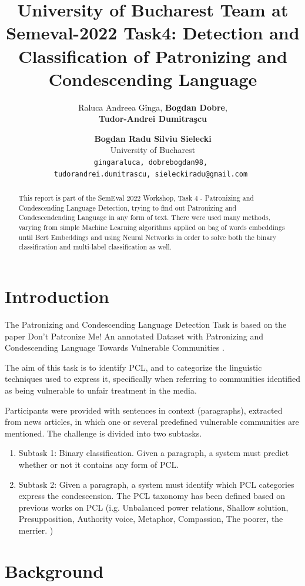 \documentclass[11pt]{article}
\title{University of Bucharest Team at Semeval-2022 Task4: Detection and
	Classification of Patronizing and Condescending Language}
\author{Raluca Andreea G\^inga, {\bf Bogdan Dobre},  \\  {\bf Tudor-Andrei Dumitra\c{s}cu} \and {\bf Bogdan Radu Silviu Sielecki}\\
    University of Bucharest \\
\texttt{gingaraluca, dobrebogdan98, }\\
\texttt{tudorandrei.dumitrascu, sieleckiradu@gmail.com }
}
\begin{document}
\maketitle

\begin{abstract}
	This report is part of the SemEval 2022 Workshop, Task 4 - Patronizing and
	Condescending Language Detection, trying to find out Patronizing and
	Condescendending Language in any form of text. There were used many methods,
	varying from simple Machine Learning algorithms applied on bag of words
	embeddings until Bert Embeddings and using Neural Networks in order to solve
	both the binary classification and multi-label classification as well.
\end{abstract}

\section{Introduction}

The Patronizing and Condescending Language Detection Task \cite{perezalmendros2022semeval} is based on the
paper Don't Patronize Me! An annotated Dataset with Patronizing and
Condescending Language Towards Vulnerable Communities \cite{perezalmendros2020dont}.

The aim of this task is to identify PCL, and to categorize the linguistic
techniques used to express it, specifically when referring to communities
identified as being vulnerable to unfair treatment in the media.

Participants were provided with sentences in context (paragraphs), extracted
from news articles, in which one or several predefined vulnerable
communities are mentioned. The challenge is divided into two subtasks.

\begin{enumerate}
	\item Subtask 1: Binary classification. Given a paragraph, a system must
	      predict whether or not it contains any form of PCL.

	\item Subtask 2: Given a paragraph, a system must identify which PCL
	      categories express the condescension. The PCL taxonomy has been defined
	      based on previous works on PCL (i.g. Unbalanced power relations, Shallow
          solution, Presupposition, Authority voice, Metaphor, Compassion, The poorer,
          the merrier. )
\end{enumerate}


\section{Background}
\end{document}

